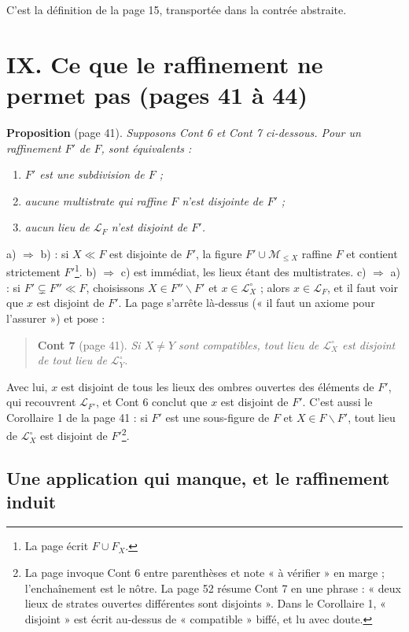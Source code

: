 \documentclass[11pt,a4paper]{article}
\begin{document}
C'est la définition de la page 15, transportée dans la contrée abstraite.

\section*{IX. Ce que le raffinement ne permet pas (pages 41 à 44)}

\textbf{Proposition} (page 41). \emph{Supposons Cont 6 et Cont 7 ci-dessous.
Pour un raffinement $F'$ de $F$, sont équivalents :}
\begin{enumerate}
\item[a)] \emph{$F'$ est une subdivision de $F$ ;}
\item[b)] \emph{aucune multistrate qui raffine $F$ n'est disjointe de $F'$ ;}
\item[c)] \emph{aucun lieu de $\mathcal{L}_{F}$ n'est disjoint de $F'$.}
\end{enumerate}

a) $\Rightarrow$ b) : si $X \ll F$ est disjointe de $F'$, la figure $F' \cup
\mathcal{M}_{\leq X}$ raffine $F$ et contient strictement $F'$\footnote{La page
écrit $F \cup F_{X}$.}. b) $\Rightarrow$ c) est immédiat, les lieux étant des
multistrates. c) $\Rightarrow$ a) : si $F' \subsetneq F'' \ll F$, choisissons
$X \in F'' \smallsetminus F'$ et $x \in \mathcal{L}^{\circ}_{X}$ ; alors $x \in
\mathcal{L}_{F}$, et il faut voir que $x$ est disjoint de $F'$. La page s'arrête
là-dessus (« il faut un axiome pour l'assurer ») et pose :

\begin{quote}
\textbf{Cont 7} (page 41). \emph{Si $X \neq Y$ sont compatibles, tout lieu de
$\mathcal{L}^{\circ}_{X}$ est disjoint de tout lieu de
$\mathcal{L}^{\circ}_{Y}$.}
\end{quote}

Avec lui, $x$ est disjoint de tous les lieux des ombres ouvertes des éléments
de $F'$, qui recouvrent $\mathcal{L}_{F'}$, et Cont 6 conclut que $x$ est
disjoint de $F'$. C'est aussi le Corollaire 1 de la page 41 : si $F'$ est une
sous-figure de $F$ et $X \in F \smallsetminus F'$, tout lieu de
$\mathcal{L}^{\circ}_{X}$ est disjoint de $F'$\footnote{La page invoque Cont 6 entre parenthèses et note « à
vérifier » en marge ; l'enchaînement est le nôtre. La page 52 résume Cont 7 en
une phrase : « deux lieux de strates ouvertes différentes sont disjoints ». Dans le Corollaire 1, « disjoint » est écrit au-dessus de « compatible » biffé, et lu avec doute.}.

\subsection*{Une application qui manque, et le raffinement induit}
\end{document}

